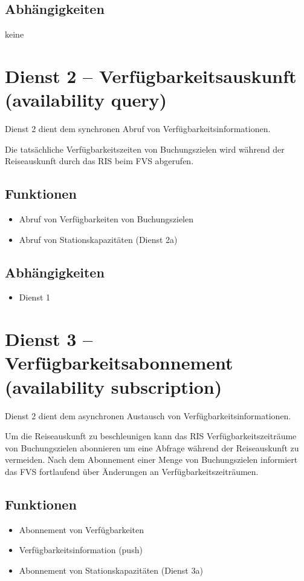 \subsection*{Abhängigkeiten}
keine 

\section{Dienst 2 -- Verfügbarkeitsauskunft (availability query) }
Dienst 2 dient dem synchronen Abruf von Verfügbarkeitsinformationen.

Die tatsächliche Verfügbarkeitszeiten von Buchungszielen wird während der Reiseauskunft durch das RIS beim FVS abgerufen. 

\subsection*{Funktionen}
\begin{itemize}
\item Abruf von Verfügbarkeiten von Buchungszielen
\item Abruf von Stationskapazitäten (Dienst 2a)
\end{itemize}

\subsection*{Abhängigkeiten}
\begin{itemize}
\item Dienst 1
\end{itemize}

\section{Dienst 3 -- Verfügbarkeitsabonnement (availability subscription) }
Dienst 2 dient dem asynchronen Austausch von Verfügbarkeitsinformationen.

Um die Reiseauskunft zu beschleunigen kann das RIS Verfügbarkeitszeiträume von Buchungszielen abonnieren um eine Abfrage während der Reiseauskunft zu vermeiden. Nach dem Abonnement einer Menge von Buchungszielen informiert das FVS fortlaufend über Änderungen an Verfügbarkeitszeiträumen.

\subsection*{Funktionen}
\begin{itemize}
\item Abonnement von Verfügbarkeiten
\item Verfügbarkeitsinformation (push)
\item Abonnement von Stationskapazitäten (Dienst 3a)
\end{itemize}

